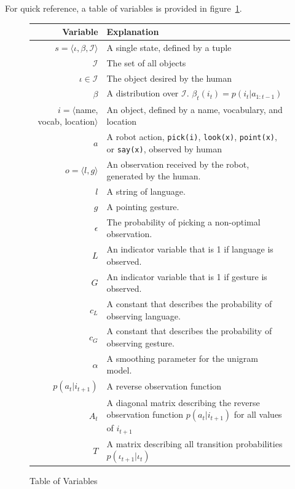 \documentclass[conference]{IEEEtran}
\newcommand{\Iota}{\mathcal{I}}
\begin{document}
For quick reference, a table of variables is provided in figure~\ref{fig:vars}. 
\begin{figure}
	\begin{center}
		\footnotesize
		\begin{tabular}{r l}
			\hline
			Variable & Explanation\\
			\hline
			$s = \langle \iota, \beta, \Iota \rangle$ & A single state, defined by a tuple \\
			$\Iota$ & The set of all objects \\
			$\iota \in \Iota$ & The object desired by the human \\
			$\beta$ & A distribution over $\Iota$. $\beta_t(i_t) = p(i_t | a_{1:t-1})$ \\
			$i = \langle$name, vocab, location$\rangle$ & An object, defined by a name, vocabulary, and location \\
			$a$ & A robot action, \texttt{pick(i)}, \texttt{look(x)}, \texttt{point(x)}, or \texttt{say(x)}, observed by human  \\
			$o = \langle l, g \rangle$ & An observation received by the robot, generated by the human.  \\
			$l$ & A string of language.  \\
			$g$ & A pointing gesture.  \\
			$\epsilon$ & The probability of picking a non-optimal observation. \\
			$L$ & An indicator variable that is 1 if language is observed.  \\
			$G$ & An indicator variable that is 1 if gesture is observed.  \\
			$c_L$ & A constant that describes the probability of observing language.  \\
			$c_G$ & A constant that describes the probability of observing gesture.  \\
			$\alpha$ & A smoothing parameter for the unigram model.  \\
			$p(a_t | i_{t+1})$ & A reverse observation function \\
			$A_t$ & A diagonal matrix describing the reverse observation function $p(a_t | i_{t+1})$ for all values of $i_{t+1}$ \\
			$T$ & A matrix describing all transition probabilities $p(\iota_{t+1}|\iota_{t})$ \\
			\hline
		\end{tabular}
		\caption{Table of Variables}
		\label{fig:vars}
	\end{center}
\end{figure}
\end{document}
